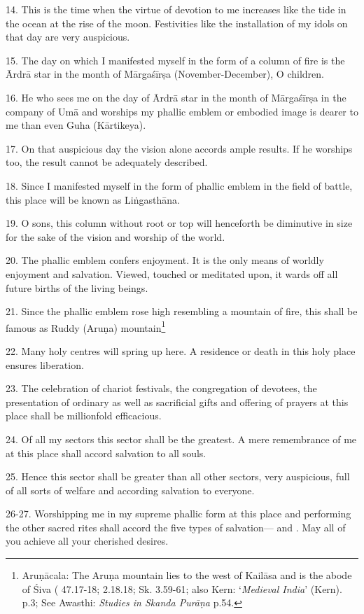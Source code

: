 14. This is the time when the virtue of devotion to me increases like the tide
in the ocean at the rise of the moon. Festivities like the installation of my
idols \etc on that day are very auspicious.

15. The day on which I manifested myself in the form of a column of fire is
the Ārdrā star in the month of Mārgaśīrṣa (November-December), O children.

16. He who sees me on the day of Ārdrā star in the month of Mārgaśīrṣa in
the company of Umā and worships my phallic emblem or embodied image is dearer
to me than even Guha (Kārtikeya).

17. On that auspicious day the vision alone accords ample results. If he
worships too, the result cannot be adequately described.

18. Since I manifested myself in the form of phallic emblem in the field of
battle, this place will be known as Liṅgasthāna.

19. O sons, this column without root or top will henceforth be diminutive in
size for the sake of the vision and worship of the world.

20. The phallic emblem confers enjoyment. It is the only means of worldly
enjoyment and salvation. Viewed, touched or meditated upon, it wards off all
future births of the living beings.

21. Since the phallic emblem rose high resembling a mountain of fire, this shall
be famous as Ruddy (Aruṇa) mountain\footnote{Aruṇācala: The Aruṇa mountain lies
to the west of Kailāsa and is the abode of Śiva ( 47.17-18;
 2.18.18; Sk. 3.59-61; also Kern: ‘\emph{Medieval India}’
(Kern). p.3; See Awasthi: \emph{Studies in Skanda Purāṇa} p.54.}

22. Many holy centres will spring up here. A residence or death in this holy
place ensures liberation.

23. The celebration of chariot festivals, the congregation of devotees,
the presentation of ordinary as well as sacrificial gifts and offering of
prayers at this place shall be millionfold efficacious.

24. Of all my sectors this sector shall be the greatest. A mere remembrance of
me at this place shall accord salvation to all souls.

25. Hence this sector shall be greater than all other sectors, very auspicious,
full of all sorts of welfare and according salvation to everyone.

26-27. Worshipping me in my supreme phallic form at this place and performing
the other sacred rites shall accord the five types of salvation— and . May all of you achieve all your
cherished desires.

